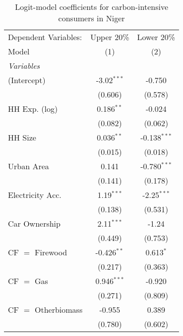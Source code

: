 
\begin{table}[htbp!]
   \centering
   \small
   \begin{adjustbox}{width = 1\textwidth, max height = 0.95\textheight, center}
      \begin{threeparttable}[b]
         \caption{\label{tab:Logit_1_NER} Logit-model coefficients for carbon-intensive consumers in Niger}
         \begin{tabular}{lcc}
            \tabularnewline \midrule \midrule
            Dependent Variables: & Upper 20\%    & Lower 20\%\\   
            Model                & (1)           & (2)\\  
            \midrule
            \emph{Variables}\\
            (Intercept)          & -3.02$^{***}$ & -0.750\\   
                                 & (0.606)       & (0.578)\\   
            HH Exp. (log)        & 0.186$^{**}$  & -0.024\\   
                                 & (0.082)       & (0.062)\\   
            HH Size              & 0.036$^{**}$  & -0.138$^{***}$\\   
                                 & (0.015)       & (0.018)\\   
            Urban Area           & 0.141         & -0.780$^{***}$\\   
                                 & (0.141)       & (0.178)\\   
            Electricity Acc.     & 1.19$^{***}$  & -2.25$^{***}$\\   
                                 & (0.138)       & (0.531)\\   
            Car Ownership        & 2.11$^{***}$  & -1.24\\   
                                 & (0.449)       & (0.753)\\   
            CF $=$ Firewood      & -0.426$^{**}$ & 0.613$^{*}$\\   
                                 & (0.217)       & (0.363)\\   
            CF $=$ Gas           & 0.946$^{***}$ & -0.920\\   
                                 & (0.271)       & (0.809)\\   
            CF $=$ Otherbiomass  & -0.955        & 0.389\\   
                                 & (0.780)       & (0.602)\\   

\end{tabular}
\end{threeparttable}
\end{adjustbox}
\end{table}

